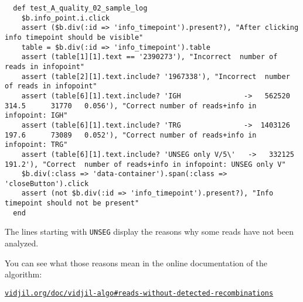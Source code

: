 \begin{verbatim}
  def test_A_quality_02_sample_log
    $b.info_point.i.click
    assert ($b.div(:id => 'info_timepoint').present?), "After clicking info timepoint should be visible"
    table = $b.div(:id => 'info_timepoint').table
    assert (table[1][1].text == '2390273'), "Incorrect  number of reads in infopoint"
    assert (table[2][1].text.include? '1967338'), "Incorrect  number of reads in infopoint"
    assert (table[6][1].text.include? 'IGH               ->   562520   314.5      31770   0.056'), "Correct number of reads+info in infopoint: IGH"
    assert (table[6][1].text.include? 'TRG               ->  1403126   197.6      73089   0.052'), "Correct number of reads+info in infopoint: TRG"
    assert (table[6][1].text.include? 'UNSEG only V/5\'   ->   332125   191.2'), "Correct  number of reads+info in infopoint: UNSEG only V"
    $b.div(:class => 'data-container').span(:class => 'closeButton').click
    assert (not $b.div(:id => 'info_timepoint').present?), "Info timepoint should not be present"
  end
\end{verbatim}

The lines starting with \texttt{UNSEG} display the reasons why some reads have
not been analyzed.

You can see what those reasons mean in the online documentation of the
algorithm:

 \centerline{\tt\href{http://www.vidjil.org/doc/vidjil-algo/\#reads-without-detected-recombinations}{vidjil.org/doc/vidjil-algo\#reads-without-detected-recombinations}}



